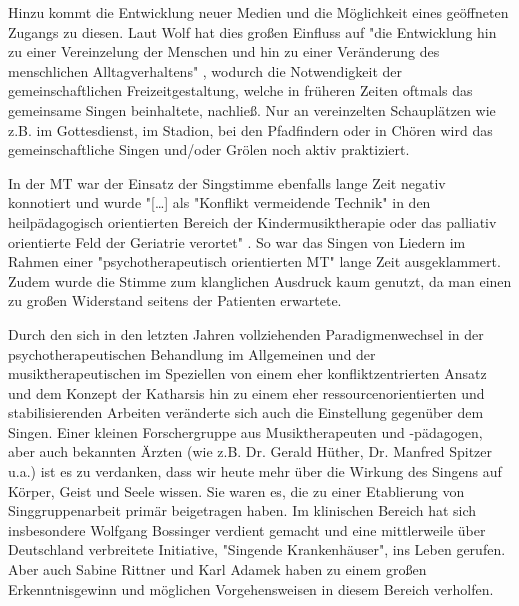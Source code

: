 Hinzu kommt die Entwicklung neuer Medien und die Möglichkeit eines geöffneten Zugangs zu diesen. Laut Wolf hat dies großen Einfluss auf "die Entwicklung hin zu einer Vereinzelung der Menschen und hin zu einer Veränderung des menschlichen Alltagverhaltens" \autocite[10]{wolf2012}, wodurch die Notwendigkeit der gemeinschaftlichen Freizeitgestaltung, welche in früheren Zeiten oftmals das gemeinsame Singen beinhaltete, nachließ. Nur an vereinzelten Schauplätzen wie z.B. im Gottesdienst, im Stadion, bei den Pfadfindern oder in Chören wird das gemeinschaftliche Singen und/oder Grölen noch aktiv praktiziert.

In der MT war der Einsatz der Singstimme ebenfalls lange Zeit negativ konnotiert und wurde "[\ldots] als "Konflikt vermeidende Technik" in den heilpädagogisch orientierten Bereich der Kindermusiktherapie oder das palliativ orientierte Feld der Geriatrie verortet" \autocite[10]{wolf2012}. So war das Singen von Liedern im Rahmen einer "psychotherapeutisch orientierten MT" lange Zeit ausgeklammert. Zudem wurde die Stimme zum klanglichen Ausdruck kaum genutzt, da man einen zu großen Widerstand seitens der Patienten erwartete. 


Durch den sich in den letzten Jahren vollziehenden Paradigmenwechsel in der psychotherapeutischen Behandlung im Allgemeinen und der musiktherapeutischen im Speziellen von einem eher konfliktzentrierten Ansatz und dem Konzept der Katharsis hin zu einem eher ressourcenorientierten und stabilisierenden Arbeiten veränderte sich auch die Einstellung gegenüber dem Singen. Einer kleinen Forschergruppe aus Musiktherapeuten und -pädagogen, aber auch bekannten Ärzten (wie z.B. Dr. Gerald Hüther, Dr. Manfred Spitzer u.a.) ist es zu verdanken, dass wir heute mehr über die Wirkung des Singens auf Körper, Geist und Seele wissen. Sie waren es, die zu einer Etablierung von Singgruppenarbeit primär beigetragen haben. Im klinischen Bereich hat sich insbesondere Wolfgang Bossinger verdient gemacht und eine mittlerweile über Deutschland verbreitete Initiative, "Singende Krankenhäuser", ins Leben gerufen. Aber auch Sabine Rittner und Karl Adamek haben zu einem großen Erkenntnisgewinn und möglichen Vorgehensweisen in diesem Bereich verholfen.

